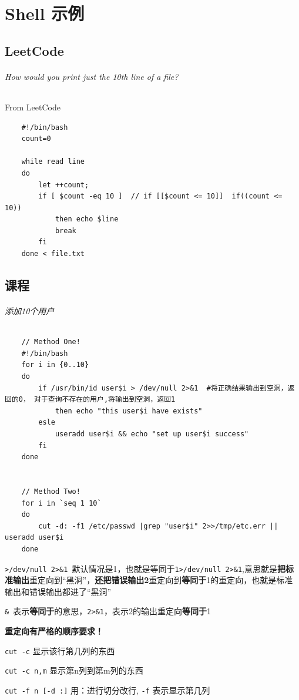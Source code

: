 \documentclass[UTF8,a4paper,12pt]{ctexbook}
\begin{document}
		 	
\chapter{Shell 示例}
	\section{LeetCode}
		 \subparagraph{How would you print just the 10th line of a file?}From LeetCode
			\begin{lstlisting}
	#!/bin/bash
	count=0
	
	while read line
	do
		let ++count;
		if [ $count -eq 10 ]  // if [[$count <= 10]]  if((count <= 10))
			then echo $line
			break
		fi
	done < file.txt
			\end{lstlisting}	
			
	\section{课程}
		\subparagraph{添加10个用户}
			\begin{lstlisting}
	// Method One!
	#!/bin/bash
	for i in {0..10} 
	do 
		if /usr/bin/id user$i > /dev/null 2>&1  #将正确结果输出到空洞，返回的0， 对于查询不存在的用户,将输出到空洞，返回1
			then echo "this user$i have exists"
		esle
			useradd user$i && echo "set up user$i success"
		fi
	done
	
	
	// Method Two!
	for i in `seq 1 10`
	do
		cut -d: -f1 /etc/passwd |grep "user$i" 2>>/tmp/etc.err || useradd user$i
	done
			\end{lstlisting}
			
			\verb|>/dev/null 2>&1 |默认情况是1，也就是等同于\verb|1>/dev/null 2>&1|,意思就是\textbf{把标准输出}重定向到“黑洞”，\textbf{还把错误输出2}重定向到\textbf{等同于}1的重定向，也就是标准输出和错误输出都进了“黑洞”
			
			\verb|& |表示\textbf{等同于}的意思，\verb|2>&1|，表示2的输出重定向\textbf{等同于}1
			
			\textbf{重定向有严格的顺序要求！}
			
			\verb|cut -c| 显示该行第几列的东西
			
			\verb|cut -c n,m| 显示第n列到第m列的东西
			
			\verb|cut -f n [-d :]| 用：进行切分改行, \verb|-f| 表示显示第几列

		\subparagraph{}
		
		\subparagraph{}	
		
		\subparagraph{}
		
		\subparagraph{}
				
\end{document}
